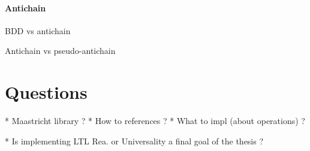 \documentclass[letterpaper]{memoir}
\begin{document}
\paragraph{Antichain}

BDD vs antichain

Antichain vs pseudo-antichain

\section{Questions}

* Maastricht library ? \cite{acacia} \cite{aapal}
* How to references ?
* What to impl (about operations) ?

* Is implementing LTL Rea. or Universality a final goal of the thesis ?



\end{document}
